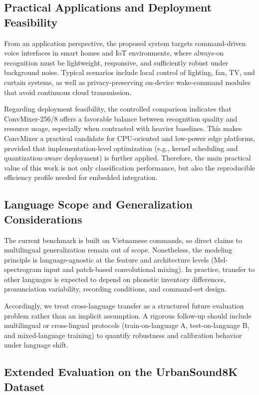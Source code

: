 \subsection*{Practical Applications and Deployment Feasibility}
From an application perspective, the proposed system targets command-driven voice interfaces in smart homes and IoT environments, where always-on recognition must be lightweight, responsive, and sufficiently robust under background noise. Typical scenarios include local control of lighting, fan, TV, and curtain systems, as well as privacy-preserving on-device wake-command modules that avoid continuous cloud transmission.

Regarding deployment feasibility, the controlled comparison indicates that ConvMixer-256/8 offers a favorable balance between recognition quality and resource usage, especially when contrasted with heavier baselines. This makes ConvMixer a practical candidate for CPU-oriented and low-power edge platforms, provided that implementation-level optimization (e.g., kernel scheduling and quantization-aware deployment) is further applied. Therefore, the main practical value of this work is not only classification performance, but also the reproducible efficiency profile needed for embedded integration.

\subsection*{Language Scope and Generalization Considerations}
The current benchmark is built on Vietnamese commands, so direct claims to multilingual generalization remain out of scope. Nonetheless, the modeling principle is language-agnostic at the feature and architecture levels (Mel-spectrogram input and patch-based convolutional mixing). In practice, transfer to other languages is expected to depend on phonetic inventory differences, pronunciation variability, recording conditions, and command-set design.

Accordingly, we treat cross-language transfer as a structured future evaluation problem rather than an implicit assumption. A rigorous follow-up should include multilingual or cross-lingual protocols (train-on-language A, test-on-language B, and mixed-language training) to quantify robustness and calibration behavior under language shift.

\subsection*{Extended Evaluation on the UrbanSound8K Dataset}

